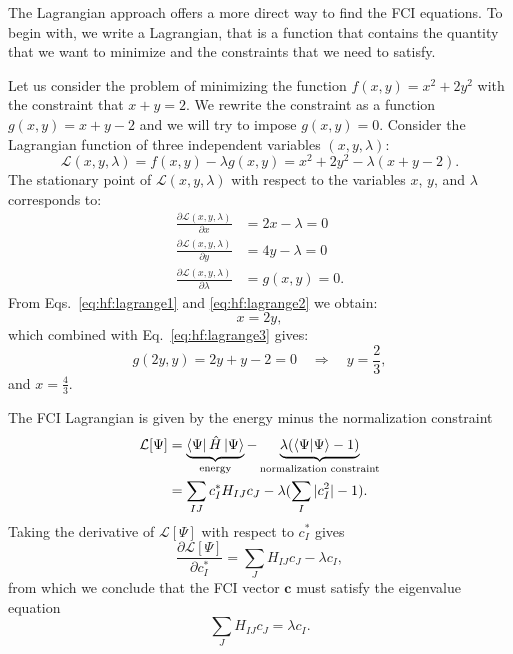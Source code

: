 \documentclass[../Main/chem532-notes.tex]{subfiles}
\begin{document}
The Lagrangian approach offers a more direct way to find the FCI equations.
To begin with, we write a Lagrangian, that is a function that contains the quantity that we want to minimize and the constraints that we need to satisfy.

\begin{example}
Let us consider the problem of minimizing the function $f(x,y) = x^2 + 2 y^2$ with the constraint that $x + y = 2$.
We rewrite the constraint as a function $g(x,y) = x + y - 2$ and we will try to impose $g(x,y) = 0$.
Consider the Lagrangian function of three independent variables $(x,y,\lambda)$:
\begin{equation}
\mathcal{L}(x,y,\lambda) = f(x,y) - \lambda g(x,y) =  x^2 + 2 y^2 - \lambda (x + y - 2).
\end{equation}
The stationary point of $\mathcal{L}(x,y,\lambda)$ with respect to the variables $x$, $y$, and $\lambda$ corresponds to:
\begin{align}
\frac{\partial \mathcal{L}(x,y,\lambda)}{\partial x} &= 2 x - \lambda = 0 \label{eq:hf:lagrange1}\\
\frac{\partial \mathcal{L}(x,y,\lambda)}{\partial y} &= 4 y - \lambda = 0 \label{eq:hf:lagrange2}\\
\frac{\partial \mathcal{L}(x,y,\lambda)}{\partial \lambda} &= g(x,y)  = 0.\label{eq:hf:lagrange3}
\end{align}
From Eqs.~\eqref{eq:hf:lagrange1} and \eqref{eq:hf:lagrange2} we obtain:
\begin{equation}
x = 2y,
\end{equation}
which combined with Eq.~\eqref{eq:hf:lagrange3} gives: 
\begin{equation}
g(2y,y)  = 2y + y - 2 = 0 \quad \Rightarrow \quad y = \frac{2}{3},
\end{equation}
and $x = \frac{4}{3}$.
\end{example}

The FCI Lagrangian is given by the energy minus the normalization constraint
\begin{equation}
\begin{split}
\mathcal{L}[\Psi] & = \underbrace{\bra{\Psi} \hat{H} \ket{\Psi}}_{\text{energy}} - \underbrace{\lambda (\braket{\Psi|\Psi} - 1)}_{\text{normalization constraint}} \\
& = \sum_{IJ} c_I^{*} H_{IJ} c_J - \lambda (\sum_{I} |c_I^2| - 1).
\end{split}
\end{equation}
Taking the derivative of $\mathcal{L}[\Psi]$ with respect to $c_I^{*}$ gives
\begin{equation}
\frac{\partial \mathcal{L}[\Psi] }{\partial c_I^{*}} = \sum_{J} H_{IJ} c_J - \lambda c_I,
\end{equation}
from which we conclude that the FCI vector $\mathbf{c}$ must satisfy the eigenvalue equation
\begin{equation}
\sum_{J} H_{IJ} c_J = \lambda c_I.
\end{equation}
\end{document}
